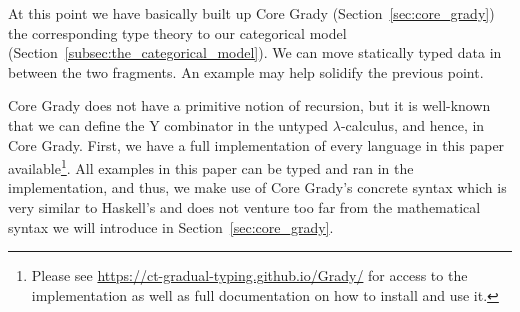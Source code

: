 At this point we have basically built up Core Grady
(Section~\ref{sec:core_grady}) the corresponding type theory to our
categorical model (Section~\ref{subsec:the_categorical_model}).  We
can move statically typed data in between the two fragments. An example
may help solidify the previous point.

Core Grady does not have a primitive notion of recursion, but it is
well-known that we can define the Y combinator in the untyped
$\lambda$-calculus, and hence, in Core Grady. First, we have a full
implementation of every language in this paper
available\footnote{\label{fn:impl} Please see
  \url{https://ct-gradual-typing.github.io/Grady/} for access to the
  implementation as well as full documentation on how to install and
  use it.}. All examples in this paper can be typed and ran in the
implementation, and thus, we make use of Core Grady's concrete syntax
which is very similar to Haskell's and does not venture too far from
the mathematical syntax we will introduce in
Section~\ref{sec:core_grady}.

